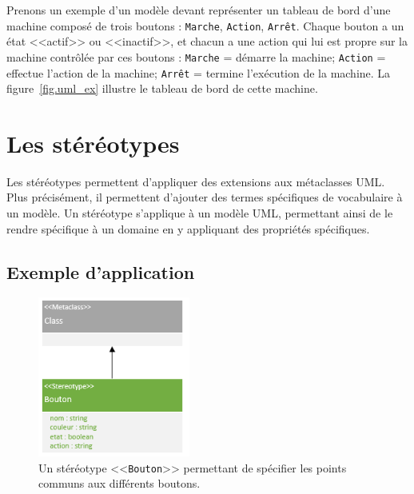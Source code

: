 Prenons un exemple d'un mod\`ele devant représenter un tableau de bord d'une machine composé de trois boutons : \texttt{Marche}, \texttt{Action}, \texttt{Arrêt}.
Chaque bouton a un état <<actif>> ou <<inactif>>, et
chacun a une action qui lui est propre sur la machine contr\^ol\'ee par ces boutons : \texttt{Marche} = démarre la machine; \texttt{Action} = effectue l'action de la machine; \texttt{Arrêt} = termine l'ex\'ecution de la machine.
%
La figure~\ref{fig.uml_ex} illustre le tableau de bord de cette machine.


\section{Les stéréotypes}
\label{sect.uml.ster}
Les stéréotypes permettent d'appliquer des extensions aux métaclasses UML.
Plus pr\'ecis\'ement, il permettent d'ajouter des termes spécifiques de vocabulaire à un mod\`ele.
Un stéréotype s'applique à un mod\`ele UML, permettant ainsi de le rendre spécifique à un domaine en y appliquant des propriétés spécifiques.

\subsection{Exemple d'application}

\begin{figure}
    \begin{center}
    \includegraphics[width=5cm]{10_img/chap4/button.PNG}
    \caption{Un st\'er\'eotype <<\texttt{Bouton}>> permettant de sp\'ecifier les points communs aux diff\'erents boutons.}
    \label{fig.uml_but_definition}
    \end{center}
\end{figure}



